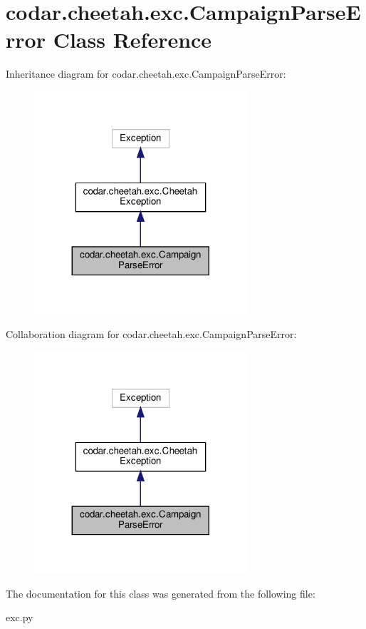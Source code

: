\hypertarget{classcodar_1_1cheetah_1_1exc_1_1_campaign_parse_error}{}\section{codar.\+cheetah.\+exc.\+Campaign\+Parse\+Error Class Reference}
\label{classcodar_1_1cheetah_1_1exc_1_1_campaign_parse_error}


Inheritance diagram for codar.\+cheetah.\+exc.\+Campaign\+Parse\+Error\+:
\nopagebreak
\begin{figure}[H]
\begin{center}
\leavevmode
\includegraphics[width=224pt]{classcodar_1_1cheetah_1_1exc_1_1_campaign_parse_error__inherit__graph}
\end{center}
\end{figure}


Collaboration diagram for codar.\+cheetah.\+exc.\+Campaign\+Parse\+Error\+:
\nopagebreak
\begin{figure}[H]
\begin{center}
\leavevmode
\includegraphics[width=224pt]{classcodar_1_1cheetah_1_1exc_1_1_campaign_parse_error__coll__graph}
\end{center}
\end{figure}


The documentation for this class was generated from the following file\+:\begin{DoxyCompactItemize}
\item 
exc.\+py\end{DoxyCompactItemize}
